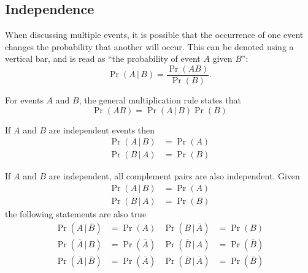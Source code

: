 \documentclass{article}
\begin{document}
\subsection{Independence}
\begin{definition}
    When discussing multiple events, it is possible that the occurrence of one event changes
    the probability that another will occur. This can be denoted using a vertical bar,
    and is read as ``the probability of event \(A\) given \(B\)'':
    \begin{equation*}
        \Pr{\left( A \,\vert\, B \right)} = \frac{\Pr{\left( A B \right)}}{\Pr{\left( B \right)}}.
    \end{equation*}
\end{definition}
\begin{definition}
    For events \(A\) and \(B\), the general multiplication rule states that
    \begin{equation*}
        \Pr{\left( A B \right)} = \Pr{\left( A \,\vert\, B \right)} \Pr{\left( B \right)}
    \end{equation*}
\end{definition}
\begin{theorem}
    If \(A\) and \(B\) are independent events then
    \begin{align*}
        \Pr{\left( A \,\vert\, B \right)} & = \Pr{\left( A \right)} \\
        \Pr{\left( B \,\vert\, A \right)} & = \Pr{\left( B \right)}
    \end{align*}
\end{theorem}
\begin{theorem}
    If \(A\) and \(B\) are independent, all complement pairs are also independent.
    Given
    \begin{align*}
        \Pr{\left( A \,\vert\, B \right)} & = \Pr{\left( A \right)} \\
        \Pr{\left( B \,\vert\, A \right)} & = \Pr{\left( B \right)}
    \end{align*}
    the following statements are also true
    \begin{align*}
        \Pr{\left( A \,\vert\, \overline{B} \right)}            & = \Pr{\left( A \right)}            & \Pr{\left( B \,\vert\, \overline{A} \right)}            & = \Pr{\left( B \right)}            \\
        \Pr{\left( \overline{A} \,\vert\, B \right)}            & = \Pr{\left( \overline{A} \right)} & \Pr{\left( \overline{B} \,\vert\, A \right)}            & = \Pr{\left( \overline{B} \right)} \\
        \Pr{\left( \overline{A} \,\vert\, \overline{B} \right)} & = \Pr{\left( \overline{A} \right)} & \Pr{\left( \overline{B} \,\vert\, \overline{A} \right)} & = \Pr{\left( \overline{B} \right)}
    \end{align*}
\end{theorem}
\end{document}
